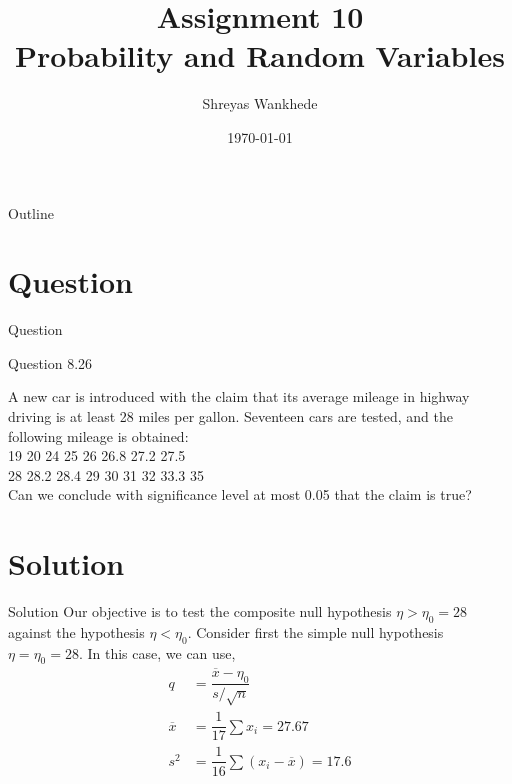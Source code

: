 \documentclass{beamer}
\title{Assignment 10\\Probability and Random Variables}
\author{Shreyas Wankhede}
\date{\today}
\institute{IIT Hyderabad}
\begin{document}
\begin{frame}
    \titlepage 
\end{frame}

\logo{}


\begin{frame}{Outline}
    \tableofcontents
\end{frame}


\section{Question}
\begin{frame}{Question}

\begin{block}{Question 8.26}

 A new car is introduced with the claim that its average mileage in highway driving is at least
28 miles per gallon. Seventeen cars are tested, and the following mileage is obtained:\\
19\hspace{2.5mm} 20 \hspace{2.5mm} 24\hspace{2.5mm}  25 \hspace{2.5mm} 26\hspace{2.5mm}  26.8 \hspace{2.5mm} 27.2 \hspace{2.5mm} 27.5 \\28\hspace{2.5mm}  28.2 \hspace{2.5mm} 28.4 \hspace{2.5mm} 29 \hspace{2.5mm} 30 \hspace{2.5mm} 31 \hspace{2.5mm} 32\hspace{2.5mm} 33.3 \hspace{2.5mm} 35\\
Can we conclude with significance level at most 0.05 that the claim is true?
\end{block}

\end{frame}


\section{Solution}
\begin{frame}{Solution}
    Our objective is to test the composite null hypothesis $\eta>\eta_0=28$ against the hypothesis $\eta< \eta_0$. Consider first the simple null hypothesis $\eta=\eta_0=28$. In this case, we can use,
    \begin{align}
    q&=\dfrac{\overline{x}-\eta_0}{s/\sqrt{n}}\nonumber\\\nonumber
    \overline{x}&=\dfrac{1}{17}\sum x_i=27.67\\\nonumber
    s^2&=\dfrac{1}{16}\sum(x_i-\overline{x})=17.6\nonumber
    \end{align}
\end{frame} 
\end{document}
